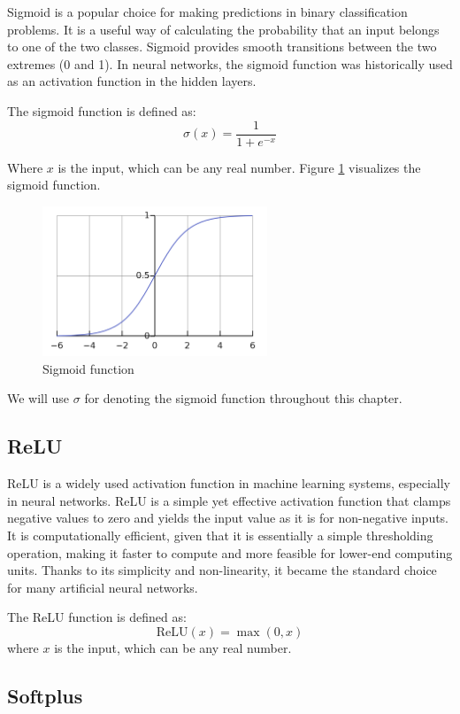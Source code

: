 Sigmoid is a popular choice for making predictions in binary classification problems. It is a useful way of calculating the probability that an input belongs to one of the two classes. Sigmoid provides smooth transitions between the two extremes (0 and 1). In neural networks, the sigmoid function was historically used as an activation function in the hidden layers.

The sigmoid function is defined as:
\[ \sigma(x) = \frac{1}{1 + e^{-x}} \]

Where $x$ is the input, which can be any real number. Figure \ref{fig:sigmoid} visualizes the sigmoid function.

\begin{figure}[H]
    \centering
    \includegraphics[width=0.6\textwidth]{img/sigmoid.png}
    \caption{Sigmoid function}
    \label{fig:sigmoid}
\end{figure}

We will use $\sigma$ for denoting the sigmoid function throughout this chapter.

\subsection{ReLU}

\ac{ReLU} is a widely used activation function in machine learning systems, especially in neural networks. \ac{ReLU} is a simple yet effective activation function that clamps negative values to zero and yields the input value as it is for non-negative inputs. It is computationally efficient, given that it is essentially a simple thresholding operation, making it faster to compute and more feasible for lower-end computing units. Thanks to its simplicity and non-linearity, it became the standard choice for many artificial neural networks.

The \ac{ReLU} function is defined as:
\[
\text{ReLU}(x) = \max(0, x)
\]
\noindent
where $x$ is the input, which can be any real number.


\subsection{Softplus}

